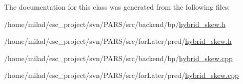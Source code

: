 The documentation for this class was generated from the following files:\begin{DoxyCompactItemize}
\item 
/home/milad/esc\_\-project/svn/PARS/src/backend/bp/\hyperlink{backend_2bp_2hybrid__skew_8h}{hybrid\_\-skew.h}\item 
/home/milad/esc\_\-project/svn/PARS/src/forLater/pred/\hyperlink{forLater_2pred_2hybrid__skew_8h}{hybrid\_\-skew.h}\item 
/home/milad/esc\_\-project/svn/PARS/src/backend/bp/\hyperlink{backend_2bp_2hybrid__skew_8cpp}{hybrid\_\-skew.cpp}\item 
/home/milad/esc\_\-project/svn/PARS/src/forLater/pred/\hyperlink{forLater_2pred_2hybrid__skew_8cpp}{hybrid\_\-skew.cpp}\end{DoxyCompactItemize}
